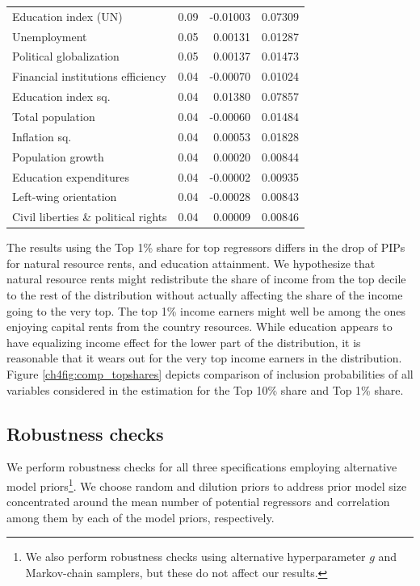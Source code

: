 \documentclass[preprint, nonatbib, 10pt]{elsarticle}
\begin{document}
\begin{table}[ht!]
\begin{tabular}{lrrr}
  Education index (UN) & 0.09 & -0.01003 & 0.07309 \\ 
  Unemployment & 0.05 & 0.00131 & 0.01287 \\ 
  Political globalization & 0.05 & 0.00137 & 0.01473 \\ 
  Financial institutions efficiency & 0.04 & -0.00070 & 0.01024 \\ 
  Education index sq. & 0.04 & 0.01380 & 0.07857 \\ 
  Total population & 0.04 & -0.00060 & 0.01484 \\ 
  Inflation sq. & 0.04 & 0.00053 & 0.01828 \\ 
  Population growth & 0.04 & 0.00020 & 0.00844 \\
  Education expenditures & 0.04 & -0.00002 & 0.00935 \\ 
  Left-wing orientation & 0.04 & -0.00028 & 0.00843 \\ 
  Civil liberties \& political rights & 0.04 & 0.00009 & 0.00846 \\
    \bottomrule
  \end{tabular}
\end{table}

The results using the Top 1\% share for top regressors differs in the drop of \acp{PIP} for natural resource rents, and education attainment. We hypothesize that natural resource rents might redistribute the share of income from the top decile to the rest of the distribution without actually affecting the share of the income going to the very top. The top 1\% income earners might well be among the ones enjoying capital rents from the country resources. While education appears to have equalizing income effect for the lower part of the distribution, it is reasonable that it wears out for the very top income earners in the distribution. Figure \ref{ch4fig:comp_topshares} depicts comparison of inclusion probabilities of all variables considered in the estimation for the Top 10\% share and Top 1\% share.

\subsection{Robustness checks}
We perform robustness checks for all three specifications employing alternative model priors\footnote{We also perform robustness checks using alternative hyperparameter $g$ and Markov-chain samplers, but these do not affect our results.}. We choose random and dilution priors to address prior model size concentrated around the mean number of potential regressors and correlation among them by each of the model priors, respectively.
\end{document}
